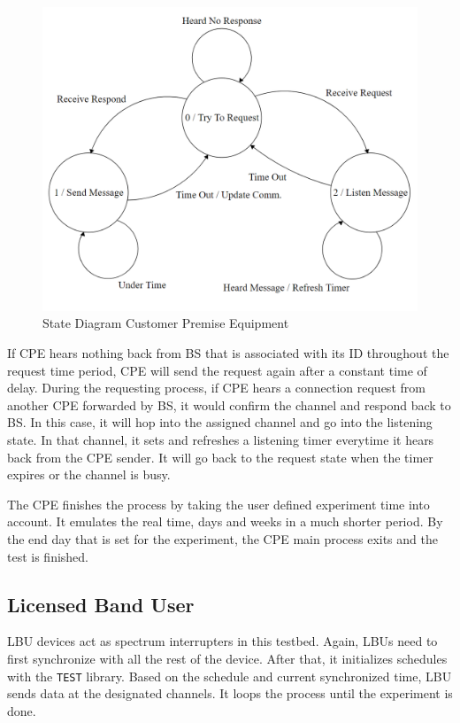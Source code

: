 \begin{figure}[ht]
\centering
\includegraphics[width=14cm]{figures/state_diagram_cpe.png}
\caption{State Diagram Customer Premise Equipment}
\label{fig:state_diagram_cpe}
\end{figure}

If CPE hears nothing back from BS that is associated with its ID throughout the request time period, CPE will send the request again after a constant time of delay. During the requesting process, if CPE hears a connection request from another CPE forwarded by BS, it would confirm the channel and respond back to BS. In this case, it will hop into the assigned channel and go into the listening state. In that channel, it sets and refreshes a listening timer everytime it hears back from the CPE sender. It will go back to the request state when the timer expires or the channel is busy. 

The CPE finishes the process by taking the user defined experiment time into account. It emulates the real time, days and weeks in a much shorter period. By the end day that is set for the experiment, the CPE main process exits and the test is finished.  

\subsection{Licensed Band User}

LBU devices act as spectrum interrupters in this testbed. Again, LBUs need to first synchronize with all the rest of the device. After that, it initializes schedules with the \texttt{TEST} library. Based on the schedule and current synchronized time, LBU sends data at the designated channels. It loops the process until the experiment is done.


